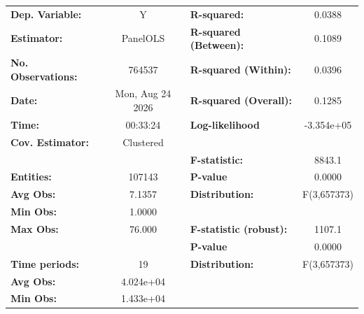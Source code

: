 

\begin{center}
\begin{tabular}{lclc}
\toprule
\textbf{Dep. Variable:}         &         Y          & \textbf{  R-squared:         }   &      0.0388      \\
\textbf{Estimator:}             &      PanelOLS      & \textbf{  R-squared (Between):}  &      0.1089      \\
\textbf{No. Observations:}      &       764537       & \textbf{  R-squared (Within):}   &      0.0396      \\
\textbf{Date:}                  &  Mon, Aug 24 2026  & \textbf{  R-squared (Overall):}  &      0.1285      \\
\textbf{Time:}                  &      00:33:24      & \textbf{  Log-likelihood     }   &    -3.354e+05    \\
\textbf{Cov. Estimator:}        &     Clustered      & \textbf{                     }   &                  \\
\textbf{}                       &                    & \textbf{  F-statistic:       }   &      8843.1      \\
\textbf{Entities:}              &       107143       & \textbf{  P-value            }   &      0.0000      \\
\textbf{Avg Obs:}               &       7.1357       & \textbf{  Distribution:      }   &   F(3,657373)    \\
\textbf{Min Obs:}               &       1.0000       & \textbf{                     }   &                  \\
\textbf{Max Obs:}               &       76.000       & \textbf{  F-statistic (robust):} &      1107.1      \\
\textbf{}                       &                    & \textbf{  P-value            }   &      0.0000      \\
\textbf{Time periods:}          &         19         & \textbf{  Distribution:      }   &   F(3,657373)    \\
\textbf{Avg Obs:}               &     4.024e+04      & \textbf{                     }   &                  \\
\textbf{Min Obs:}               &     1.433e+04      & \textbf{                     }   &                  \\

\end{tabular}
\end{center}
